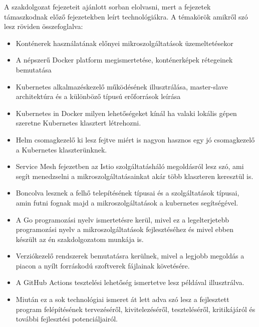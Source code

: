 A szakdolgozat fejezeteit ajánlott sorban elolvasni, mert a fejezetek támaszkodnak előző fejezetekben leírt technológiákra. A témakörök amikről szó lesz röviden összefoglalva:
\begin{itemize}
    \item Konténerek használatának előnyei mikroszolgáltatások üzemeltetésekor
    \item A népszerű Docker platform megismertetése, konténerképek rétegeinek bemutatása
    \item Kubernetes alkalmazéskezelő működésének illusztrálása, master-slave architektúra és a különböző típusú erőforrások leírása
    \item Kubernetes in Docker milyen lehetőségeket kínál ha valaki lokális gépen szeretne Kubernetes klasztert létrehozni.
    \item Helm csomagkezelő ki lesz fejtve miért is nagyon hasznos egy jó csomagkezelő a Kubernetes klaszterünknek.
    \item Service Mesh fejezetben az Istio szolgáltatásháló megoldásról lesz szó, ami segít menedzselni a mikroszolgáltatásainkat akár több klaszteren keresztül is.
    \item Boncolva lesznek a felhő telepítésének típusai és a szolgáltatások típusai, amin futni fognak majd a mikroszolgáltatások a kubernetes segítségével.
    \item A Go programozási nyelv ismertetésre kerül, mivel ez a legelterjetebb programozási nyelv a mikroszolgáltatások fejlesztéséhez és mivel ebben készült az én szakdolgozatom munkája is.
    \item Verziókezelő rendszerek bemutatásra kerülnek, mivel a legjobb megoldás a piacon a nyílt forráskodú szoftverek fájlainak követésére.
    \item A GitHub Actions tesztelési lehetőség ismertetve lesz példával illusztrálva.
    \item Miután ez a sok technológiai ismeret át lett adva szó lesz a fejlesztett program felépítésének tervezéséről, kivitelezéséről, teszteléséről, kritikájáról és további fejlesztési potenciáljairól.
\end{itemize}
